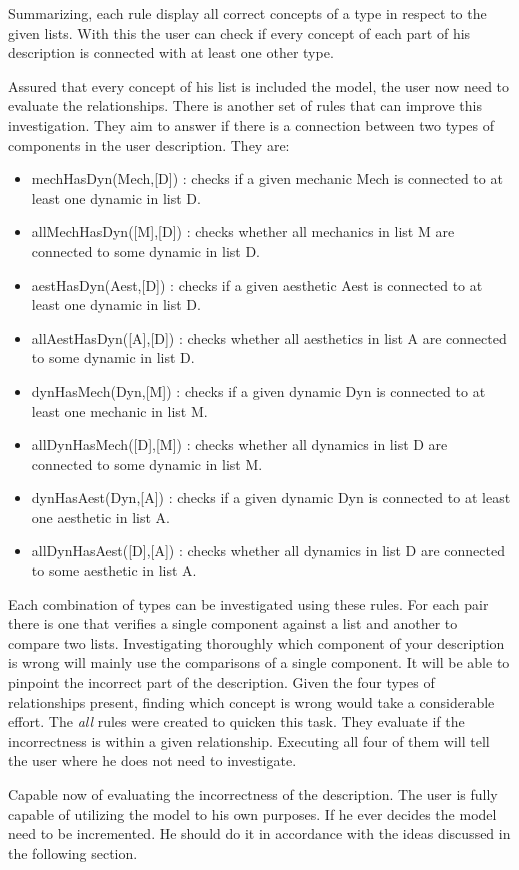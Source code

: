 Summarizing, each rule display all correct concepts of a type in respect to the given lists. With this the user can check if every concept of each part of his description is connected with at least one other type.

Assured that every concept of his list is included the model, the user now need to evaluate the relationships. There is another set of rules that can improve this investigation. They aim to answer if there is a connection between two types of components in the user description. They are:

\begin{itemize}
    \item mechHasDyn(Mech,[D]) : checks if a given mechanic Mech is connected to at least one dynamic in list D.
    \item allMechHasDyn([M],[D]) : checks whether all mechanics in list M are connected to some dynamic in list D.
    
    \item aestHasDyn(Aest,[D]) : checks if a given aesthetic Aest is connected to at least one dynamic in list D.
    \item allAestHasDyn([A],[D]) : checks whether all aesthetics in list A are connected to some dynamic in list D.
    
    \item dynHasMech(Dyn,[M]) : checks if a given dynamic Dyn is connected to at least one mechanic in list M.
    \item allDynHasMech([D],[M]) : checks whether all dynamics in list D are connected to some dynamic in list M.
    
    \item dynHasAest(Dyn,[A]) : checks if a given dynamic Dyn is connected to at least one aesthetic in list A.
    \item allDynHasAest([D],[A]) : checks whether all dynamics in list D are connected to some aesthetic in list A.
    
\end{itemize}

Each combination of types can be investigated using these rules. For each pair there is one that verifies a single component against a list and another to compare two lists. Investigating thoroughly which component of your description is wrong will mainly use the comparisons of a single component. It will be able to pinpoint the incorrect part of the description. Given the four types of relationships present, finding which concept is wrong would take a considerable effort. The \textit{all} rules were created to quicken this task. They evaluate if the incorrectness is within a given relationship. Executing all four of them will tell the user where he does not need to investigate.

Capable now of evaluating the incorrectness of the description. The user is fully capable of utilizing the model to his own purposes. If he ever decides the model need to be incremented. He should do it in accordance with the ideas discussed in the following section.